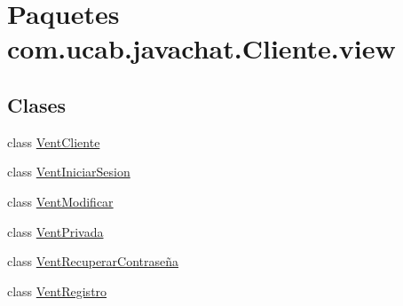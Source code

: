 \hypertarget{namespacecom_1_1ucab_1_1javachat_1_1_cliente_1_1view}{\section{Paquetes com.\-ucab.\-javachat.\-Cliente.\-view}
\label{namespacecom_1_1ucab_1_1javachat_1_1_cliente_1_1view}
}
\subsection*{Clases}
\begin{DoxyCompactItemize}
\item 
class \hyperlink{classcom_1_1ucab_1_1javachat_1_1_cliente_1_1view_1_1_vent_cliente}{Vent\-Cliente}
\item 
class \hyperlink{classcom_1_1ucab_1_1javachat_1_1_cliente_1_1view_1_1_vent_iniciar_sesion}{Vent\-Iniciar\-Sesion}
\item 
class \hyperlink{classcom_1_1ucab_1_1javachat_1_1_cliente_1_1view_1_1_vent_modificar}{Vent\-Modificar}
\item 
class \hyperlink{classcom_1_1ucab_1_1javachat_1_1_cliente_1_1view_1_1_vent_privada}{Vent\-Privada}
\item 
class \hyperlink{classcom_1_1ucab_1_1javachat_1_1_cliente_1_1view_1_1_vent_recuperar_contrase_xC3_xB1a}{Vent\-Recuperar\-Contraseña}
\item 
class \hyperlink{classcom_1_1ucab_1_1javachat_1_1_cliente_1_1view_1_1_vent_registro}{Vent\-Registro}
\end{DoxyCompactItemize}
